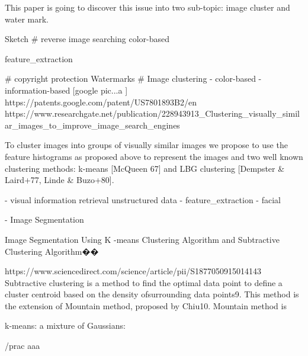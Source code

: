 This paper is going to discover this issue into two sub-topic: image cluster and water mark.

Sketch
# reverse image searching
    color-based

    feature_extraction   

# copyright protection
    Watermarks  
# Image clustering
    - color-based
    - information-based [google pic...a ]
    https://patents.google.com/patent/US7801893B2/en  
    https://www.researchgate.net/publication/228943913_Clustering_visually_similar_images_to_improve_image_search_engines  {

To cluster images into groups of visually similar images we propose to use the feature histograms as proposed above to represent the images and two well known clustering methods: k-means [McQueen 67] and LBG clustering [Dempster & Laird+77, Linde & Buzo+80]. 
    }
        - visual information retrieval
         unstructured data
        - feature_extraction   
        - facial 

        - Image Segmentation  

Image Segmentation Using K -means Clustering Algorithm and Subtractive Clustering Algorithm��{
https://www.sciencedirect.com/science/article/pii/S1877050915014143
Subtractive clustering is a method to find the optimal data point to define a cluster centroid based on the density ofsurrounding data points9. This method is the extension of Mountain method, proposed by Chiu10. Mountain method is

}

k-means: 
a mixture of Gaussians: 

/prac aaa

